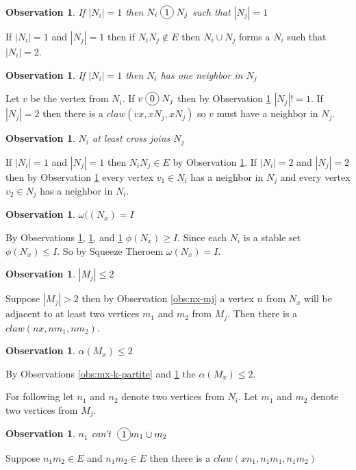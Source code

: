 \documentclass[12pt]{article}
\newcommand*\circled[1]{\tikz[baseline=(char.base)]{
            \node[shape=circle,draw,inner sep=2pt] (char) {#1};}}
\newtheorem{Observation}[Theorem]{Observation}
\begin{document}
\begin{Observation}\label{obs:ni-join-1}
If $|N_i| = 1$ then $N_i \;\circled{1}\; N_j$ such that $|N_j| = 1$
\end{Observation}
 If $|N_i| = 1$ and $|N_j| = 1$ then if $N_iN_j \not \in E$ then $N_i \cup N_j$ forms a $N_i$ such that $|N_i| = 2$.

\begin{Observation}\label{obs:ni-1-neighbor}
If $|N_i| = 1$ then $N_i$ has one neighbor in $N_j$
\end{Observation}
 Let $v$ be the vertex from $N_i$. If $v \;\circled{0}\; N_j$ then by Observation \ref{obs:ni-join-1} $|N_j| != 1$. If $|N_j| = 2$ then there is a $claw (vx, xN_j, xN_j)$ so $v$ must have a neighbor in $N_j$.

\begin{Observation}\label{obs:ni-2-neighbor}
$N_i$ at least cross joins $N_j$
\end{Observation}
 If $|N_i| = 1$ and $|N_j| = 1$ then $N_iN_j \in E$ by Observation \ref{obs:ni-join-1}. If $|N_i| = 2$ and $|N_j| = 2$ then by Observation \ref{obs:ni-1-neighbor} every vertex $v_1 \in N_i$ has a neighbor in $N_j$ and every vertex $v_2 \in N_j$ has a neighbor in $N_i$.

\begin{Observation}\label{obs:nx-clique}
$\omega((N_x) = I$
\end{Observation} 
 By Observations \ref{obs:ni-join-1}, \ref{obs:ni-1-neighbor}, and \ref{obs:ni-2-neighbor} $\phi(N_x) \geq I$. Since each $N_i$ is a stable set $\phi(N_x) \leq I$. So by Squeeze Theroem $\omega(N_x) = I$.



\begin{Observation}\label{obs:mj-2}
$|M_j| \leq 2$
\end{Observation}
 Suppose $|M_j| > 2$ then by Observation \ref{obs:nx-mj} a vertex $n$ from $N_x$ will be adjacent to at least two vertices $m_1$ and $m_2$ from $M_j$. Then there is a $claw (nx, nm_1, nm_2)$.

\begin{Observation}\label{obs:alpha-mx}
$\alpha(M_x) \leq 2$
\end{Observation}
 By Observations \ref{obs:mx-k-partite} and \ref{obs:mj-2} the $\alpha(M_x) \leq 2$.

For following let $n_1$ and $n_2$ denote two vertices from $N_i$. Let $m_1$ and $m_2$ denote two vertices from $M_j$.
\begin{Observation}\label{obs:ni-cant-join-mi}
$n_1$ can't $\;\circled{1} m_1 \cup m_2$ 
\end{Observation}
 Suppose $n_1m_2 \in E$ and $n_1m_2 \in E$ then there is a $claw(xn_1, n_1m_1, n_1m_2)$
\end{document}
